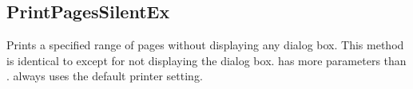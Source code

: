 \documentclass[letterpaper,12pt,english,openany,oneside]{sphinxmanual}
\begin{document}
\subsection{PrintPagesSilentEx}
\label{\detokenize{IAC_API_OLE_Objects:printpagessilentex}}
Prints a specified range of pages without displaying any dialog box. This method is identical to   except for not displaying the dialog box.  has more parameters than .  always uses the default printer setting.


\begin{sphinxVerbatim}[commandchars=\\\{\}]
  
                  

                    

                    

                  

                  

                  
\end{sphinxVerbatim}
\label{\detokenize{IAC_API_OLE_Objects:parameters-28}}
\end{document}
